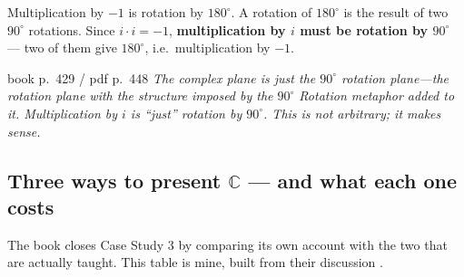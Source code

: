 \vspace{8pt}
\begin{ideabox}[title={Why the $i$-axis is at $90^{\circ}$ --- the question formal presentations cannot answer}]
Multiplication by $-1$ is rotation by $180^{\circ}$. A rotation of $180^{\circ}$ is the result of two
$90^{\circ}$ rotations. Since $i\cdot i=-1$, \textbf{multiplication by $i$ must be rotation by
$90^{\circ}$} --- two of them give $180^{\circ}$, i.e.\ multiplication by $-1$.
\begin{bookquote}{book p.~429 / pdf p.~448}
\textit{The complex plane is just the $90^{\circ}$ rotation plane---the rotation plane with the
structure imposed by the $90^{\circ}$ Rotation metaphor added to it. Multiplication by $i$ is ``just''
rotation by $90^{\circ}$. This is not arbitrary; it makes sense.}
\end{bookquote}
\end{ideabox}

\clearpage
\subsection{Three ways to present \texorpdfstring{$\mathbb{C}$}{C} --- and what each one costs}

The book closes Case Study 3 by comparing its own account with the two that are actually taught.
This table is mine, built from their discussion .

